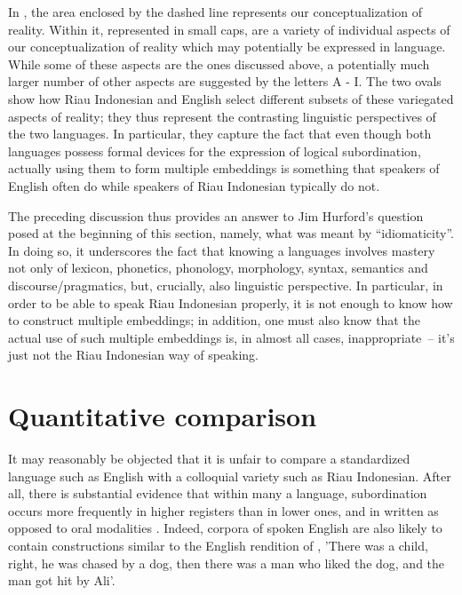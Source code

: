 \documentclass[output=paper,colorlinks,citecolor=brown
]{langscibook}
\begin{document}
In , the area enclosed by the dashed line represents our conceptualization of reality.  Within it, represented in small caps, are a variety of individual aspects of our conceptualization of reality which may potentially be expressed in language.  While some of these aspects are the ones discussed above, a potentially much larger number of other aspects are suggested by the letters A - I.  The two ovals show how Riau Indonesian and English select different subsets of these variegated aspects of reality; they thus represent the contrasting linguistic perspectives of the two languages.  In particular, they capture the fact that even though both languages possess formal devices for the expression of logical subordination, actually using them to form multiple embeddings is something that speakers of English often do while speakers of Riau Indonesian typically do not.

The preceding discussion thus provides an answer to Jim Hurford's question posed at the beginning of this section, namely, what was meant by ``idiomaticity''.  In doing so, it underscores the fact that knowing a languages involves mastery not only of lexicon, phonetics, phonology, morphology, syntax, semantics and discourse/pragmatics, but, crucially, also linguistic perspective.  In particular, in order to be able to speak Riau Indonesian properly, it is not enough to know how to construct multiple embeddings; in addition, one must also know that the actual use of such multiple embeddings is, in almost all cases, inappropriate~– it's just not the Riau Indonesian way of speaking.

\section{Quantitative comparison}
It may reasonably be objected that it is unfair to compare a standardized language such as English with a colloquial variety such as Riau Indonesian.  After all, there is substantial evidence that within many a language, subordination occurs more frequently in higher registers than in lower ones, and in written as opposed to oral modalities \citep[and others]{givon1979understanding,deutscher2000syntactic,karlsson2009aorigin,karlsson2009bsyntactic}. Indeed, corpora of spoken English are also likely to contain constructions similar to the English rendition of , 'There was a child, right, he was chased by a dog, then there was a man who liked the dog, and the man got hit by Ali'. 
\end{document}
